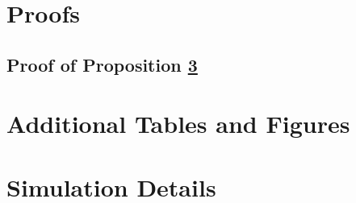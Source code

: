 \documentclass[12pt]{article}
\begin{document}
\newpage


\newpage
\appendix

\section{Proofs}
    \subsection{Proof of Proposition \ref{}}

\section{Additional Tables and Figures}

\section{Simulation Details}
\end{document}
